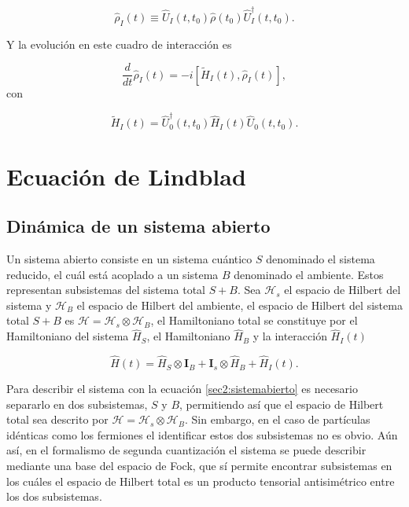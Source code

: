 \begin{equation*}
    \hat{\rho}_{I}(t) \equiv \hat{U}_{I}(t,t_{0})\hat{\rho}(t_{0})\hat{U}^{\dagger}_{I}(t,t_{0}).
\end{equation*}

Y la evolución en este cuadro de interacción es 

\begin{equation}
    \frac{d}{dt}\hat{\rho}_{I}(t) = -i[\tilde{H}_{I}(t), \hat{\rho}_{I}(t)],
    \label{sec11:interactionp}
\end{equation}
con 

\begin{equation*}
    \tilde{H}_{I}(t) = \hat{U}^{\dagger}_{0}(t,t_{0})\hat{H}_{I}(t)\hat{U}_{0}(t,t_{0}).
\end{equation*}

\label{sec:closedQM}



\section{Ecuación de Lindblad}
\label{SEClindblad}
\subsection{Dinámica de un sistema abierto}

Un sistema abierto consiste en un sistema cuántico $S$ denominado el sistema reducido, el cuál está acoplado a un sistema $B$ denominado el ambiente. Estos representan  subsistemas del sistema total $S+B$. Sea $\mathcal{H}_{s}$ el espacio de Hilbert del sistema y $\mathcal{H}_{B}$ el espacio de Hilbert del ambiente, el espacio de Hilbert del sistema total $S+B$ es  $\mathcal{H} = \mathcal{H}_{s} \otimes \mathcal{H}_{B}$, el Hamiltoniano total se constituye por el Hamiltoniano del sistema $\hat{H}_{S}$, el Hamiltoniano $\hat{H}_{B}$ y la interacción $\hat{H}_{I}(t)$

\begin{equation}
    \hat{H}(t) = \hat{H}_{S} \otimes \mathbf{I}_{B} + \mathbf{I}_{s} \otimes \hat{H}_{B} + \hat{H}_{I}(t).
    \label{sec2:sistemabierto}
\end{equation}

Para describir el sistema con la ecuación \ref{sec2:sistemabierto} es necesario separarlo en dos subsistemas, $S$ y $B$, permitiendo así que el espacio de Hilbert total sea descrito por $\mathcal{H} = \mathcal{H}_{s}\otimes \mathcal{H}_{B}$. Sin embargo, en el caso de partículas idénticas como los fermiones el identificar estos dos subsistemas no es obvio. Aún así, en el formalismo de segunda cuantización el sistema se puede describir mediante una base del espacio de Fock, que sí permite encontrar subsistemas en los cuáles el espacio de Hilbert total es un producto tensorial antisimétrico entre los dos subsistemas\cite{friis2013fermionic,vidal2021quantum}.

